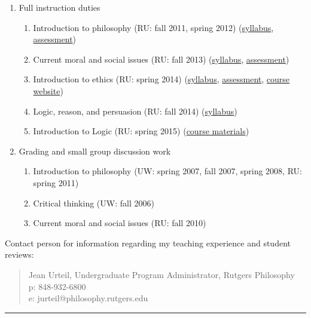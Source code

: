 \documentclass[10pt]{article}
\begin{document}
\begin{enumerate}[$\;$]
  \item Full instruction duties
    \begin{enumerate}[$\blacktriangleright$]
      \item Introduction to philosophy (RU: fall 2011, spring 2012) (\href{http://www.erikhoversten.org/teaching/ru103s12-syllabus.pdf}{syllabus}, \href{http://www.erikhoversten.org/teaching/ru103s12-assessment.pdf}{assessment})
      \item Current moral and social issues (RU: fall 2013) (\href{http://www.erikhoversten.org/teaching/ru105f13-syllabus.pdf}{syllabus}, \href{http://www.erikhoversten.org/teaching/ru105f13-assessment.pdf}{assessment})
      \item Introduction to ethics (RU: spring 2014) (\href{http://www.erikhoversten.org/teaching/ru107s14-syllabus.pdf}{syllabus}, \href{http://www.erikhoversten.org/teaching/ru107s14-assessment.pdf}{assessment}, \href{http://erikhoversten.org/teaching/ru107-s14/course-info/}{course website})
      \item Logic, reason, and persuasion (RU: fall 2014) (\href{http://www.erikhoversten.org/teaching/ru101f14-syllabus.pdf}{syllabus})
      \item Introduction to Logic (RU: spring 2015) (\href{http://ru201s15.pancakeapps.com}{course materials})
    \end{enumerate}
  \item Grading and small group discussion work
    \begin{enumerate}[$\blacktriangleright$]
      \item Introduction to philosophy (UW: spring 2007, fall 2007, spring 2008, RU: spring 2011)
      \item Critical thinking (UW: fall 2006)
      \item Current moral and social issues (RU: fall 2010)
    \end{enumerate}
\end{enumerate}

Contact person for information regarding my teaching experience and student reviews: 
\begin{quote}
Jean Urteil, Undergraduate Program Administrator, Rutgers Philosophy \\
p: 848-932-6800 \\
e: jurteil@philosophy.rutgers.edu
\end{quote}

\hrule
\end{document}
